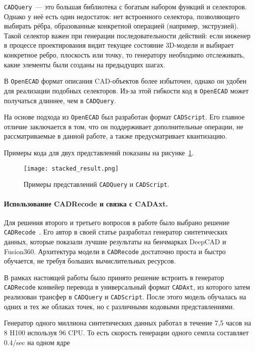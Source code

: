 \texttt{CADQuery}~— это большая библиотека с богатым набором функций и селекторов. Однако у неё есть
один недостаток: нет встроенного селектора, позволяющего выбирать рёбра, образованные конкретной
операцией (например, экструзией). Такой селектор важен при генерации последовательности действий:
если инженер в процессе проектирования видит текущее состояние 3D-модели и выбирает конкретное
ребро, плоскость или точку, то генератору необходимо отслеживать, какие элементы были созданы на предыдущих шагах.

В \texttt{OpenECAD} формат описания CAD-объектов более избыточен, однако он удобен для реализации
подобных селекторов. Из-за этой гибкости код в \texttt{OpenECAD} может получаться длиннее, чем в
\texttt{CADQuery}.

На основе подхода из \texttt{OpenECAD} был разработан формат \texttt{CADScript}. Его главное отличие
заключается в том, что он поддерживает дополнительные операции, не рассматриваемые в данной работе,
а также предусматривает квантизацию.

Примеры кода для двух представлений показаны на рисунке~\ref{fig:cadformats}.

\begin{figure}[h!]
    \centering
    \texttt{[image: stacked\_result.png]}
    \caption{Примеры представлений \texttt{CADQuery} и \texttt{CADScript}.}
    \label{fig:cadformats}
\end{figure}

\paragraph{Использование CADRecode и связка с CADAxt.}
Для решения второго и третьего вопросов в работе было выбрано решение
\texttt{CADRecode}~\cite{rukhovich24_cadrecode}. Его автор в своей статье разработал генератор синтетических
данных, которые показали лучшие результаты на бенчмарках DeepCAD и Fusion360.
Архитектура модели в \texttt{CADRecode} достаточно проста и быстро обучается,
не требуя больших вычислительных ресурсов.

В рамках настоящей работы было принято решение встроить в генератор
\texttt{CADRecode} конвейер перевода в универсальный формат \texttt{CADAxt}, из
которого затем реализован трансфер в \texttt{CADQuery} и
\texttt{CADScript}. После этого модель обучалась на одних и тех же облаках точек,
но с различными кодовыми представлениями.

Генератор одного миллиона синтетических данных работал в течение 7,5 часов на 8 H100
используя 96 CPU. То есть скорость генерации одного семпла составляет 0.4/sec на одном ядре

